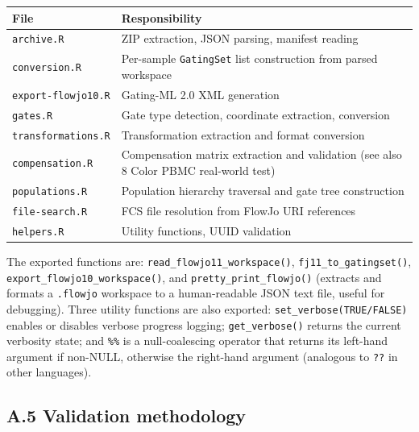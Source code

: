\documentclass[
]{article}
\begin{document}
\begin{longtable}[]{@{}
  >{\raggedright\arraybackslash}p{}
  >{\raggedright\arraybackslash}p{}@{}}
\toprule\noalign{}
\begin{minipage}[b]{\linewidth}\raggedright
File
\end{minipage} & \begin{minipage}[b]{\linewidth}\raggedright
Responsibility
\end{minipage} \\
\midrule\noalign{}
\endhead
\bottomrule\noalign{}
\endlastfoot
\texttt{archive.R} & ZIP extraction, JSON parsing, manifest reading \\
\texttt{conversion.R} & Per-sample \texttt{GatingSet} list construction
from parsed workspace \\
\texttt{export-flowjo10.R} & Gating-ML 2.0 XML generation \\
\texttt{gates.R} & Gate type detection, coordinate extraction,
conversion \\
\texttt{transformations.R} & Transformation extraction and format
conversion \\
\texttt{compensation.R} & Compensation matrix extraction and validation
(see also 8 Color PBMC real-world test) \\
\texttt{populations.R} & Population hierarchy traversal and gate tree
construction \\
\texttt{file-search.R} & FCS file resolution from FlowJo URI
references \\
\texttt{helpers.R} & Utility functions, UUID validation \\
\end{longtable}

The exported functions are: \texttt{read\_flowjo11\_workspace()},
\texttt{fj11\_to\_gatingset()}, \texttt{export\_flowjo10\_workspace()},
and \texttt{pretty\_print\_flowjo()} (extracts and formats a
\texttt{.flowjo} workspace to a human-readable JSON text file, useful
for debugging). Three utility functions are also exported:
\texttt{set\_verbose(TRUE/FALSE)} enables or disables verbose progress
logging; \texttt{get\_verbose()} returns the current verbosity state;
and \texttt{\%\textbar{}\textbar{}\%} is a null-coalescing operator that
returns its left-hand argument if non-NULL, otherwise the right-hand
argument (analogous to \texttt{??} in other languages).

\subsection{A.5 Validation
methodology}\label{a.5-validation-methodology}
\end{document}
